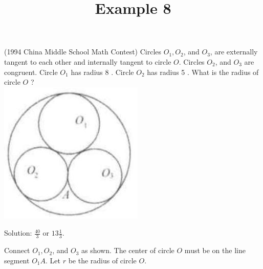 \documentclass{article}
\title{Example 8}
\date{}
\begin{document}
\maketitle

(1994 China Middle School Math Contest) Circles \(O_{1}, O_{2}\), and \(O_{3}\), are externally tangent to each other and internally tangent to circle \(O\). Circles \(O_{2}\), and \(O_{3}\) are congruent. Circle \(O_{1}\) has radius 8 . Circle \(O_{2}\) has radius 5 . What is the radius of circle \(O\) ?\\
\centering
\includegraphics[width=\textwidth]{images/problem_image_1.jpg}

Solution: \(\frac{40}{3}\) or \(13 \frac{1}{3}\).


Connect \(O_{1}, O_{2}\), and \(O_{3}\) as shown. The center of circle \(O\) must be on the line segment \(O_{1} A\). Let \(r\) be the radius of circle \(O\).
\end{document}
